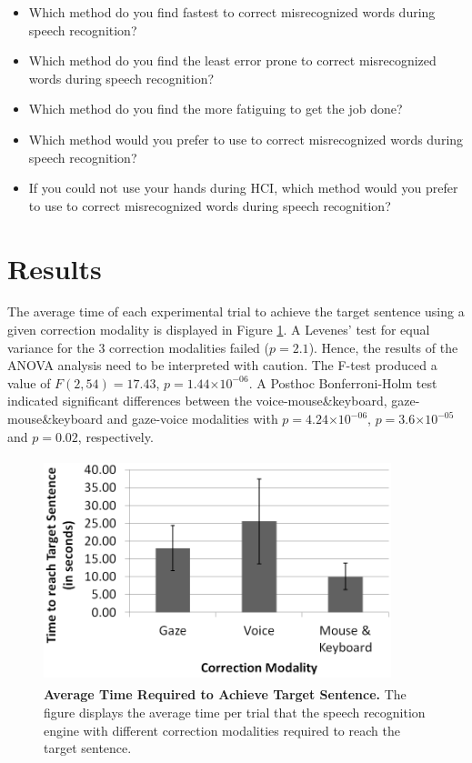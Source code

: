 \documentclass[]{article}
\providecommand{\e}[1]{\ensuremath{\times 10^{#1}}}
\begin{document}
\begin{itemize}
  \item Which method do you find fastest to correct misrecognized words during speech recognition?
	\item Which method do you find the least error prone to correct misrecognized words during speech recognition?
	\item Which method do you find the more fatiguing to get the job done?
	\item Which method would you prefer to use to correct misrecognized words during speech recognition?
	\item If you could not use your hands during HCI, which method would you prefer to use to correct misrecognized words during speech recognition?
\end{itemize}


\section{Results}
The average time of each experimental trial to achieve the target sentence using a given correction modality is
displayed in Figure \ref{timeFig}. A Levenes' test for equal variance for the 3 correction modalities failed ($p=2.1$).
Hence, the results of the ANOVA analysis need to be interpreted with caution. The F-test produced a value of
$F(2,54)=17.43$, $p=1.44\e{-06}$. A Posthoc Bonferroni-Holm test indicated significant differences between the
voice-mouse\&keyboard, gaze-mouse\&keyboard and gaze-voice modalities with $p=4.24\e{-06}$, $p=3.6\e{-05}$ and $p=0.02$,
respectively.
 

\begin{figure}[!ht]
\begin{center}
\includegraphics[width=0.9\textwidth,height=65mm]{figures/time.png}
\end{center}
\vspace{-3mm}
\caption{\textbf{Average Time Required to Achieve Target Sentence.} The figure displays the average time per trial that
the speech recognition engine with different correction modalities required to reach the target sentence.}
\label{timeFig}
\end{figure}
\end{document}
